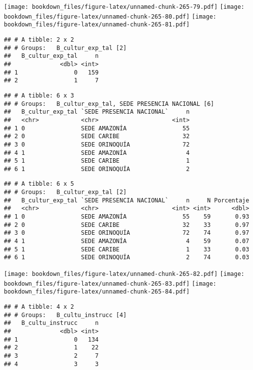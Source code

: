 \documentclass[]{article}
\theoremstyle{definition}
\theoremstyle{definition}
\theoremstyle{definition}
\theoremstyle{remark}
\begin{document}
\texttt{[image: bookdown\_files/figure-latex/unnamed-chunk-265-79.pdf]}
\texttt{[image: bookdown\_files/figure-latex/unnamed-chunk-265-80.pdf]}
\texttt{[image: bookdown\_files/figure-latex/unnamed-chunk-265-81.pdf]}

\begin{verbatim}
## # A tibble: 2 x 2
## # Groups:   B_cultur_exp_tal [2]
##   B_cultur_exp_tal     n
##              <dbl> <int>
## 1                0   159
## 2                1     7
\end{verbatim}

\begin{verbatim}
## # A tibble: 6 x 3
## # Groups:   B_cultur_exp_tal, SEDE PRESENCIA NACIONAL [6]
##   B_cultur_exp_tal `SEDE PRESENCIA NACIONAL`     n
##   <chr>            <chr>                     <int>
## 1 0                SEDE AMAZONÍA                55
## 2 0                SEDE CARIBE                  32
## 3 0                SEDE ORINOQUÍA               72
## 4 1                SEDE AMAZONÍA                 4
## 5 1                SEDE CARIBE                   1
## 6 1                SEDE ORINOQUÍA                2
\end{verbatim}

\begin{verbatim}
## # A tibble: 6 x 5
## # Groups:   B_cultur_exp_tal [2]
##   B_cultur_exp_tal `SEDE PRESENCIA NACIONAL`     n     N Porcentaje
##   <chr>            <chr>                     <int> <int>      <dbl>
## 1 0                SEDE AMAZONÍA                55    59       0.93
## 2 0                SEDE CARIBE                  32    33       0.97
## 3 0                SEDE ORINOQUÍA               72    74       0.97
## 4 1                SEDE AMAZONÍA                 4    59       0.07
## 5 1                SEDE CARIBE                   1    33       0.03
## 6 1                SEDE ORINOQUÍA                2    74       0.03
\end{verbatim}

\texttt{[image: bookdown\_files/figure-latex/unnamed-chunk-265-82.pdf]}
\texttt{[image: bookdown\_files/figure-latex/unnamed-chunk-265-83.pdf]}
\texttt{[image: bookdown\_files/figure-latex/unnamed-chunk-265-84.pdf]}

\begin{verbatim}
## # A tibble: 4 x 2
## # Groups:   B_cultu_instrucc [4]
##   B_cultu_instrucc     n
##              <dbl> <int>
## 1                0   134
## 2                1    22
## 3                2     7
## 4                3     3
\end{verbatim}
\end{document}
